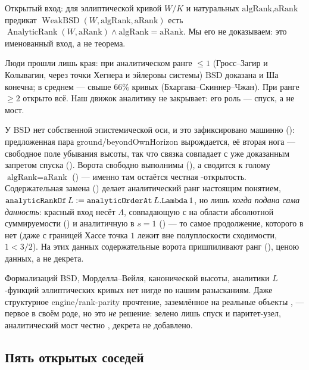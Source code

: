 \begin{definition}\label{def:WeakBSD}
\red{} Открытый вход: для эллиптической кривой $W/K$ и натуральных $\text{algRank},\text{aRank}$
предикат $\operatorname{WeakBSD}(W,\text{algRank},\text{aRank})$ есть
$\operatorname{AnalyticRank}(W,\text{aRank})\wedge\text{algRank}=\text{aRank}$. Мы его не
доказываем: это именованный вход, а не теорема.
\end{definition}

Люди прошли лишь края: при аналитическом ранге $\le 1$ (Гросс–Загир и Колывагин, через точки Хегнера
и эйлеровы системы) BSD доказана и Ша конечна; в среднем — свыше $66\%$ кривых
(Бхаргава–Скиннер–Чжан). При ранге $\ge 2$ открыто всё. Наш движок аналитику не закрывает: его роль —
спуск, а не мост.

У BSD нет собственной эпистемической оси, и это зафиксировано машинно
(): предложенная пара ground/beyondOwnHorizon вырождается, её вторая
нога — свободное поле убывания высоты, так что связка совпадает с уже доказанным запретом спуска
(). Ворота  свободно выполнимы
(), а  сводится к голому
$\text{algRank}=\text{aRank}$ () — именно там остаётся
честная \red{}-открытость. Содержательная замена () делает
аналитический ранг настоящим понятием, $\texttt{analyticRankOf}\,L:=\texttt{analyticOrderAt}\,
L.\texttt{Lambda}\,1$, но лишь \emph{когда подана сама данность}: красный вход
 несёт $\Lambda$, совпадающую с  на области
абсолютной суммируемости () и аналитичную в $s=1$ () — то самое
продолжение, которого в  нет (даже с границей Хассе точка $1$ лежит вне полуплоскости
сходимости, $1<3/2$). На этих данных содержательные ворота  пришпиливают ранг
(), ценою данных, а не декрета.

Формализаций BSD, Морделла–Вейля, канонической высоты, аналитики $L$-функций эллиптических кривых нет
нигде по нашим разысканиям. Даже структурное engine/rank-parity прочтение, заземлённое на реальные
объекты , — первое в своём роде, но это \emph{не} решение: зелено лишь спуск и
паритет-узел, аналитический мост честно \red{}, декрета не добавлено.

\subsection{Пять открытых соседей}

